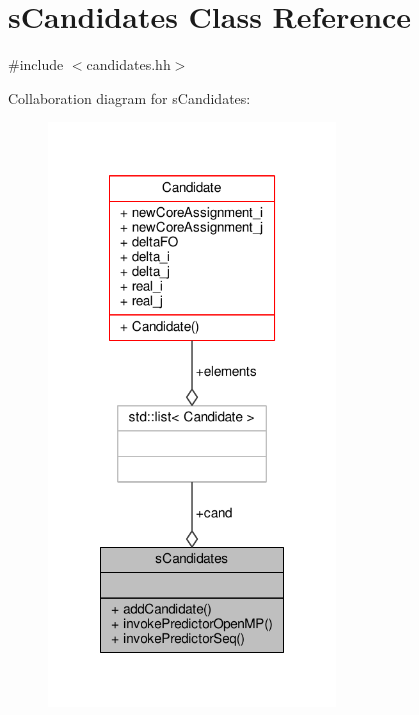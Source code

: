 \hypertarget{classsCandidates}{\section{s\-Candidates Class Reference}
\label{classsCandidates}
}


{\ttfamily \#include $<$candidates.\-hh$>$}



Collaboration diagram for s\-Candidates\-:\nopagebreak
\begin{figure}[H]
\begin{center}
\leavevmode
\includegraphics[width=216pt]{classsCandidates__coll__graph}
\end{center}
\end{figure}
